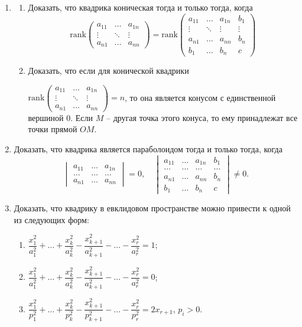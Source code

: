 \begin{enumerate}
	\item
	\begin{enumerate}
		\item Доказать, что квадрика коническая тогда и только тогда, когда
		\[
			\mathrm{rank}\begin{pmatrix}
				a_{11} & \ldots & a_{1n} \\
				\vdots & \ddots & \vdots \\
				a_{n1} & \ldots & a_{nn}
			\end{pmatrix} =
			\mathrm{rank}\begin{pmatrix}
				a_{11} & \ldots & a_{1n} & b_1 \\
				\vdots & \ddots & \vdots & \vdots \\
				a_{n1} & \ldots & a_{nn} & b_n \\
				b_1 & \ldots & b_n & c
			\end{pmatrix}
		\]
		\item Доказать, что если для конической квадрики
		
		$\mathrm{rank}\begin{pmatrix}
			a_{11} & \ldots & a_{1n} \\
			\vdots & \ddots & \vdots \\
			a_{n1} & \ldots & a_{nn}
		\end{pmatrix} = n$, то она является конусом с единственной вершиной $0$. Если $M$ -- другая точка этого конуса, то ему принадлежат все точки прямой $OM$.
	\end{enumerate}

	\item Доказать, что квадрика является параболоидом тогда и только тогда, когда
	\[
		\begin{vmatrix}
			a_{11} & \hdots & a_{1n} \\
			\hdots & \hdots & \hdots \\
			a_{n1} & \hdots & a_{nn}
		\end{vmatrix} = 0, \quad
		\begin{vmatrix}
			a_{11} & \hdots & a_{1n} & b_1 \\
			\hdots & \hdots & \hdots & \hdots \\
			a_{n1} & \hdots & a_{nn} & b_n \\
			b_1 & \hdots & b_n & c
		\end{vmatrix} \ne 0.
	\]

	\item Доказать, что квадрику в евклидовом пространстве можно привести к одной из следующих форм:
	\begin{enumerate}
		\item $\dfrac{x_1^2}{a_1^2} + \ldots + \dfrac{x_k^2}{a_k^2} - \dfrac{x_{k+1}^2}{a_{k+1}^2} - \ldots - \dfrac{x_r^2}{a_r^2} = 1$;
		\item $\dfrac{x_1^2}{a_1^2} + \ldots + \dfrac{x_k^2}{a_k^2} - \dfrac{x_{k+1}^2}{a_{k+1}^2} - \ldots - \dfrac{x_r^2}{a_r^2} = 0$;
		\item $\dfrac{x_1^2}{p_1^2} + \ldots + \dfrac{x_k^2}{p_k^2} - \dfrac{x_{k+1}^2}{p_{k+1}^2} - \ldots - \dfrac{x_r^2}{p_r^2} = 2x_{r+1}$, $p_i > 0$.
	\end{enumerate}


\end{enumerate}
